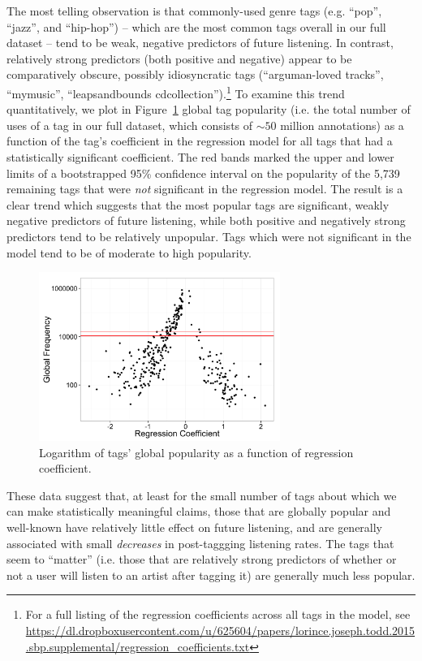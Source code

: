 The most telling observation is that commonly-used genre tags (e.g. ``pop'', ``jazz'', and ``hip-hop'') -- which are the most common tags overall in our full dataset -- tend to be weak, negative predictors of future listening. In contrast, relatively strong predictors (both positive and negative) appear to be comparatively obscure, possibly idiosyncratic tags (``arguman-loved tracks'', ``mymusic'', ``leapsandbounds cdcollection'').\footnote{For a full listing of the regression coefficients across all tags in the model, see \url{https://dl.dropboxusercontent.com/u/625604/papers/lorince.joseph.todd.2015.sbp.supplemental/regression_coefficients.txt}} To examine this trend quantitatively, we plot in Figure~\ref{fig:coefVsPopularity} global tag popularity (i.e. the total number of uses of a tag in our full dataset, which consists of $\sim 50$ million annotations) as a function of the tag's coefficient in the regression model for all tags that had a statistically significant coefficient. The red bands marked the upper and lower limits of a bootstrapped 95\% confidence interval on the popularity of the 5,739 remaining tags that were \emph{not} significant in the regression model. The result is a clear trend which suggests that the most popular tags are significant, weakly negative predictors of future listening, while both positive and negatively strong predictors tend to be relatively unpopular. Tags which were not significant in the model tend to be of moderate to high popularity.

  \begin{figure}[t]
	\centering
      \includegraphics[width=0.7\textwidth]{tagRegressionWithMoreData.png}
    \caption{Logarithm of tags' global popularity as a function of regression coefficient.}
    \label{fig:coefVsPopularity}
  \end{figure}

These data suggest that, at least for the small number of tags about which we can make statistically meaningful claims, those that are globally popular and well-known have relatively little effect on future listening, and are generally associated with small \emph{decreases} in post-taggging listening rates. The tags that seem to ``matter'' (i.e. those that are relatively strong predictors of whether or not a user will listen to an artist after tagging it) are generally much less popular.